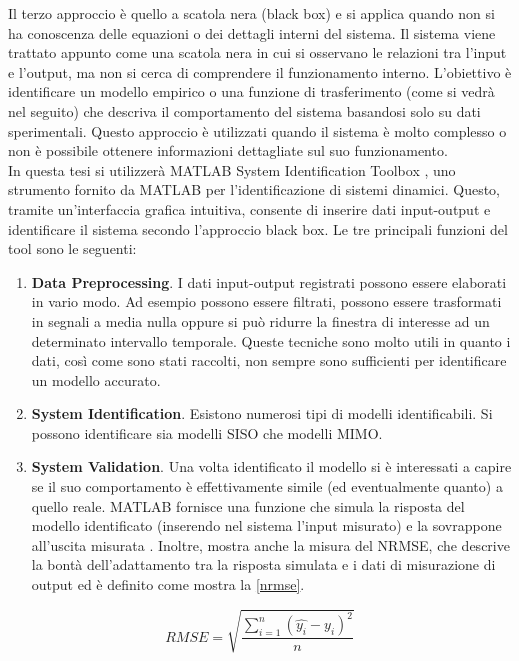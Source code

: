 Il terzo approccio è quello a scatola nera (black box) e si applica quando non si ha conoscenza delle equazioni o dei dettagli interni del sistema. Il sistema viene trattato appunto come una scatola nera in cui si osservano le relazioni tra l'input e l'output, ma non si cerca di comprendere il funzionamento interno. L'obiettivo è identificare un modello empirico o una funzione di trasferimento (come si vedrà nel seguito) che descriva il comportamento del sistema basandosi solo su dati sperimentali. Questo approccio è utilizzati quando il sistema è molto complesso o non è possibile ottenere informazioni dettagliate sul suo funzionamento.\\

In questa tesi si utilizzerà MATLAB System Identification Toolbox \cite{sysID}, uno strumento fornito da MATLAB per l'identificazione di sistemi dinamici. Questo, tramite un'interfaccia grafica intuitiva, consente di inserire dati input-output e identificare il sistema secondo l'approccio black box. Le tre principali funzioni del tool sono le seguenti:
\begin{enumerate}
	\item \textbf{Data Preprocessing}. I dati input-output registrati possono essere elaborati in vario modo. Ad esempio possono essere filtrati, possono essere trasformati in segnali a media nulla oppure si può ridurre la finestra di interesse ad un determinato intervallo temporale. Queste tecniche sono molto utili in quanto i dati, così come sono stati raccolti, non sempre sono sufficienti per identificare un modello accurato.
	\item \textbf{System Identification}. Esistono numerosi tipi di modelli identificabili. Si possono identificare sia modelli \ac{SISO} che modelli \ac{MIMO}.
	\item \textbf{System Validation}. Una volta identificato il modello si è interessati a capire se il suo comportamento è effettivamente simile (ed eventualmente quanto) a quello reale. MATLAB fornisce una funzione che simula la risposta del modello identificato (inserendo nel sistema l'input misurato) e la sovrappone all'uscita misurata \cite{compare}. Inoltre, mostra anche la misura del \ac{NRMSE}, che descrive la bontà dell'adattamento tra la risposta simulata e i dati di misurazione di output ed è definito come mostra la \ref{nrmse}.
\end{enumerate}

\begin{equation}
	RMSE = \sqrt{\frac{\sum_{i=1}^{n} {(\hat{y_i} - y_i)}^2}{n}}
	\label{rmse}
\end{equation}

